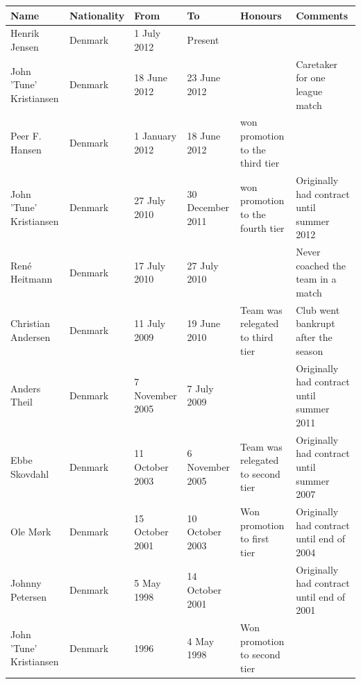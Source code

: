 \documentclass{article}
\begin{document}
\begin{tabular}{llllll}
\toprule
Name & Nationality & From & To & Honours & Comments \\
\midrule
Henrik Jensen & Denmark & 1 July 2012 & Present &  &  \\
John 'Tune' Kristiansen & Denmark & 18 June 2012 & 23 June 2012 &  & Caretaker for one league match \\
Peer F. Hansen & Denmark & 1 January 2012 & 18 June 2012 & won promotion to the third tier &  \\
John 'Tune' Kristiansen & Denmark & 27 July 2010 & 30 December 2011 & won promotion to the fourth tier & Originally had contract until summer 2012 \\
René Heitmann & Denmark & 17 July 2010 & 27 July 2010 &  & Never coached the team in a match \\
Christian Andersen & Denmark & 11 July 2009 & 19 June 2010 & Team was relegated to third tier & Club went bankrupt after the season \\
Anders Theil & Denmark & 7 November 2005 & 7 July 2009 &  & Originally had contract until summer 2011 \\
Ebbe Skovdahl & Denmark & 11 October 2003 & 6 November 2005 & Team was relegated to second tier & Originally had contract until summer 2007 \\
Ole Mørk & Denmark & 15 October 2001 & 10 October 2003 & Won promotion to first tier & Originally had contract until end of 2004 \\
Johnny Petersen & Denmark & 5 May 1998 & 14 October 2001 &  & Originally had contract until end of 2001 \\
John 'Tune' Kristiansen & Denmark & 1996 & 4 May 1998 & Won promotion to second tier &  \\
\bottomrule
\end{tabular}
\end{document}
